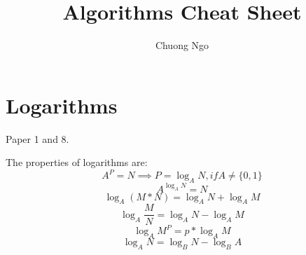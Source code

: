 \documentclass[11pt]{article}
\title{Algorithms Cheat Sheet}
\author{Chuong Ngo}
\begin{document}
\maketitle
\pagestyle{empty}

\section{Logarithms}
Paper 1 and 8.

The properties of logarithms are:
\begin{equation}
A^P = N \implies P = \log_A N, if A \neq \{0, 1\}
\end{equation}
\begin{equation}
A^{\log_{A}{N}} = N
\end{equation}
\begin{equation}
\log_A(M * N) = \log_A N + \log_A M
\end{equation}
\begin{equation}
\log_A \frac{M}{N} = \log_A N - \log_A M
\end{equation}
\begin{equation}
\log_A M^P = p * \log_A M
\end{equation}
\begin{equation}
\log_A N = \log_B N - \log_B A
\end{equation}
\end{document}
